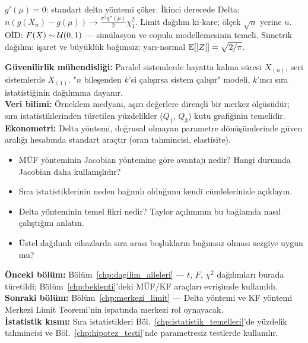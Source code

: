 \begin{mikroozet}
$g'(\mu) = 0$: standart delta yöntemi çöker.
İkinci derecede Delta: $n(g(X_n)-g(\mu)) \to \frac{\sigma^2 g''(\mu)}{2}\chi^2_1$.
Limit dağılım ki-kare; ölçek $\sqrt{n}$ yerine $n$.
OİD: $F(X)\sim\mathcal{U}(0,1)$ --- simülasyon ve copula modellemesinin temeli.
Simetrik dağılım: işaret ve büyüklük bağımsız; yarı-normal $\mathbb{E}[|Z|]=\sqrt{2/\pi}$.
\end{mikroozet}

\begin{kopru}
\textbf{Güvenilirlik mühendisliği:} Paralel sistemlerde hayatta kalma süresi $X_{(n)}$,
seri sistemlerde $X_{(1)}$. "$n$ bileşenden $k$'si çalışırsa sistem çalışır"
modeli, $k$'ıncı sıra istatistiğinin dağılımına dayanır.\\
\textbf{Veri bilimi:} Örneklem medyanı, aşırı değerlere dirençli bir merkez ölçüsüdür;
sıra istatistiklerinden türetilen yüzdelikler ($Q_1$, $Q_3$) kutu grafiğinin temelidir.\\
\textbf{Ekonometri:} Delta yöntemi, doğrusal olmayan parametre dönüşümlerinde
güven aralığı hesabında standart araçtır (oran tahmincisi, elastisite).
\end{kopru}

\begin{ozyansima}
\begin{itemize}
  \item MÜF yönteminin Jacobian yöntemine göre avantajı nedir? Hangi durumda
        Jacobian daha kullanışlıdır?
  \item Sıra istatistiklerinin neden bağımlı olduğunu kendi cümlelerinizle açıklayın.
  \item Delta yönteminin temel fikri nedir? Taylor açılımının bu bağlamda nasıl çalıştığını anlatın.
  \item Üstel dağılımlı cihazlarda sıra arası boşlukların bağımsız olması sezgiye uygun mu?
\end{itemize}
\end{ozyansima}

\begin{kopru}
\textbf{Önceki bölüm:} Bölüm~\ref{chp:dagilim_aileleri} --- $t$, $F$, $\chi^2$ dağılımları
burada türetildi; Bölüm~\ref{chp:beklenti}'deki MÜF/KF araçları evrişimde kullanıldı.\\
\textbf{Sonraki bölüm:} Bölüm~\ref{chp:merkezi_limit} --- Delta yöntemi ve KF
yöntemi Merkezi Limit Teoremi'nin ispatında merkezi rol oynayacak.\\
\textbf{İstatistik kısmı:} Sıra istatistikleri Böl.~\ref{chp:istatistik_temelleri}'de
yüzdelik tahmincisi ve Böl.~\ref{chp:hipotez_testi}'nde parametresiz testlerde kullanılır.
\end{kopru}

